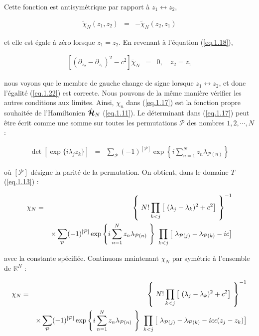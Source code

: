 Cette fonction est antisymétrique par rapport à $z_1 \leftrightarrow z_2$,

\begin{eqnarray}
	\tilde{\chi}_N(z_1 , z_2) & =& - 	\tilde{\chi}_N(z_2 , z_1)	
\end{eqnarray}

et elle est égale à zéro lorsque $z_1 = z_2$. En revenant à l'équation (\ref{eq.1.18}),

\begin{eqnarray}
	\left [ \left ( \partial_{z_2} -  \partial_{z_1} \right )^2 - c^2   \right ] \tilde{\chi}_N & = & 0, \quad z_2 = z_1  \label{eq.1.22}	
\end{eqnarray}

nous voyons que le membre de gauche change de signe lorsque $z_1 \leftrightarrow z_2$, et donc l'égalité (\ref{eq.1.22}) est correcte. Nous pouvons de la même manière vérifier les autres conditions aux limites. Ainsi, $\chi_n$ dans (\ref{eq.1.17}) est la fonction propre souhaitée de l'Hamiltonien $\hat{\bm{\mathcal{H}}}_N$ (\ref{eq.1.11}). Le déterminant dans (\ref{eq.1.17}) peut être écrit comme une somme sur toutes les permutations $\mathcal{P}$ des nombres $1, 2, \cdots, N$ :

\begin{eqnarray}
	\det [ \exp\{i\lambda_j z_k \}] & = & 	\sum_{\mathcal{P}} (-1)^{[\mathcal{P}]} \exp \left \{ i \sum_{n = 1}^N  z_n \lambda_{ \mathcal{P}(n) } \right \} 
\end{eqnarray}

où $[\mathcal{P}]$ désigne la parité de la permutation. On obtient, dans le domaine $T$ (\ref{eq.1.13}) :

\begin{eqnarray}
	\chi_N & = &	\left \{ N! \prod_{k<j} \left [ ( \lambda_j - \lambda_k )^2 + c^2 \right ] \right \}^{-1} \notag \\
	&&  \times \sum_{\mathcal{P}} (-1)^{[\mathcal{P}]} \exp \left \{ i \sum_{n = 1}^N  z_n \lambda_{ \mathcal{P}(n) } \right \} \prod_{k<j} \left [  \lambda_{\mathcal{P}(j)}- \lambda_{\mathcal{P}(k)}  -i c \right ]
\end{eqnarray}

avec la constante spécifiée. Continuons maintenant $\chi_N$ par symétrie à l'ensemble de $\mathbb{R}^N$ :

\begin{eqnarray}
	\chi_N & = &	\left \{ N! \prod_{k<j} \left [ ( \lambda_j - \lambda_k )^2 + c^2 \right ] \right \}^{-1} \notag \\
	&&  \times \sum_{\mathcal{P}} (-1)^{[\mathcal{P}]} \exp \left \{ i \sum_{n = 1}^N  z_n \lambda_{ \mathcal{P}(n) } \right \} \prod_{k<j} \left [  \lambda_{\mathcal{P}(j)}- \lambda_{\mathcal{P}(k)}  -i c \epsilon (z_j -z_k ) \right ]
\end{eqnarray}

